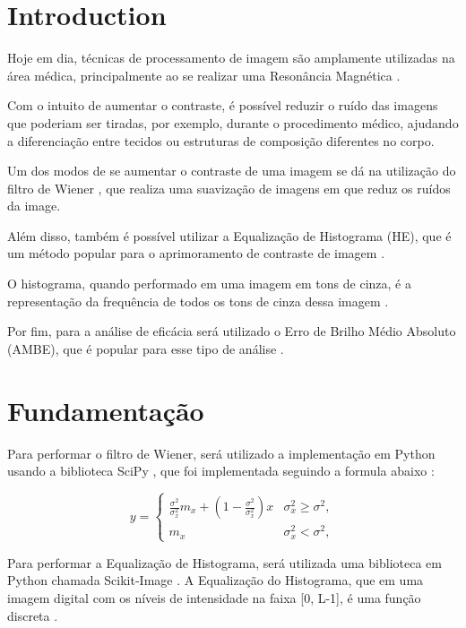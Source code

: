 \documentclass[conference]{IEEEtran}
\begin{document}
\section{Introduction}

Hoje em dia, técnicas de processamento de imagem são amplamente utilizadas na área médica, principalmente ao se realizar uma Resonância Magnética \cite{b1}. 

Com o intuito de aumentar o contraste, é possível reduzir o ruído das imagens que poderiam ser tiradas, por exemplo, durante o procedimento médico, ajudando a diferenciação entre tecidos ou estruturas de composição diferentes no corpo\cite{b2}.

Um dos modos de se aumentar o contraste de uma imagem se dá na utilização do filtro de Wiener \cite{b3}, que realiza uma suavização de imagens em que reduz os ruídos da image.

Além disso, também é possível utilizar a Equalização de Histograma (HE), que é um método popular para o aprimoramento de contraste de imagem \cite{b6} \cite{b7} \cite{b8}.

O histograma, quando performado em uma imagem em tons de cinza, é a representação da frequência de todos os tons de cinza dessa imagem \cite{b9}.

Por fim, para a análise de eficácia será utilizado o Erro de Brilho Médio Absoluto (AMBE), que é popular para esse tipo de análise \cite{b11}.

\section{Fundamentação}

Para performar o filtro de Wiener, será utilizado a implementação em Python usando a biblioteca SciPy \cite{b4}, que foi implementada seguindo a formula abaixo \cite{b5} :

\begin{equation}
y=\left\{ \begin{array}{cc} \frac{\sigma^{2}}{\sigma_{x}^{2}}m_{x}+\left(1-\frac{\sigma^{2}}{\sigma_{x}^{2}}\right)x & \sigma_{x}^{2}\geq\sigma^{2},\\ m_{x} & \sigma_{x}^{2}<\sigma^{2},\end{array}\right.
\end{equation}

Para performar a Equalização de Histograma, será utilizada uma biblioteca em Python chamada Scikit-Image \cite{b10}. A Equalização do Histograma, que em uma imagem digital com os níveis de intensidade na faixa [0, L-1], é uma função discreta \cite{b8}.
\end{document}
